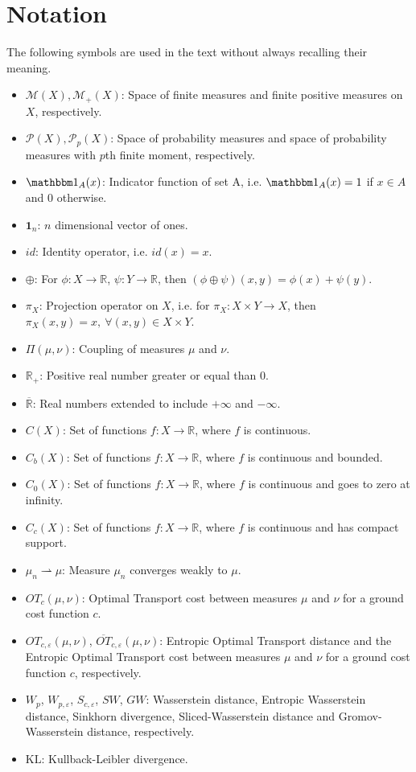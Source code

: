 
\newpage
\chapter*{Notation}

The following symbols are used in the text without always recalling their meaning.

\begin{itemize}
	\item $\mathcal M(X), \mathcal M_+(X)$: Space of finite measures and finite positive measures on $X$, respectively.
	\item $\mathcal P(X), \mathcal P_p(X)$: Space of probability measures and space of probability
	measures with $p$th finite moment, respectively.
	\item $\mathbbm 1_A(x)$: Indicator function of set A, i.e. $\mathbbm 1_A(x)=1$ if $x \in A$ and 0 otherwise.
	\item $\mathbf 1_n$: $n$ dimensional vector of ones.
	\item $id$: Identity operator, i.e. $id(x)=x$.
	\item $\oplus$: For $\phi: X \to \mathbb R$, $\psi: Y \to \mathbb R$, then $(\phi \oplus \psi)(x,y) = \phi(x) + \psi(y)$.
	\item $\pi_X$: Projection operator on $X$, i.e. for $\pi_X : X \times Y \to X$, then $\pi_X(x,y)= x, \ \forall (x,y) \in X \times Y$.
	\item $\Pi(\mu,\nu)$: Coupling of measures $\mu$ and $\nu$.
	\item $\mathbb R_+$: Positive real number greater or equal than 0.
	\item $\mathbb{\overline R}$: Real numbers extended to include $+\infty$ and $-\infty$.
	\item $C(X)$: Set of functions $f: X \to \mathbb R$, where $f$ is continuous.
	\item $C_b(X)$: Set of functions $f: X \to \mathbb R$, where $f$ is continuous and bounded.
	\item $C_0(X)$: Set of functions $f: X \to \mathbb R$, where $f$ is continuous and goes to zero at infinity.
	\item $C_c(X)$: Set of functions $f: X \to \mathbb R$, where $f$ is continuous and has compact support.
	\item $\mu_n \rightharpoonup \mu$: Measure $\mu_n$ converges weakly to $\mu$.
	\item $OT_c(\mu,\nu)$: Optimal Transport cost between measures $\mu$ and $\nu$ for a ground cost function $c$.
	\item $OT_{c,\varepsilon}(\mu,\nu)$, $\overline{OT}_{c,\varepsilon}(\mu,\nu)$:
	Entropic Optimal Transport distance and the Entropic Optimal Transport cost
	between measures $\mu$ and $\nu$ for a ground cost function $c$, respectively.
	\item $W_p$, $W_{p,\varepsilon}$, $S_{c,\varepsilon}$, $SW$, $GW$: Wasserstein distance, Entropic Wasserstein distance,
	Sinkhorn divergence,
	Sliced-Wasserstein distance and Gromov-Wasserstein distance, respectively.
	\item $\mathrm{KL}$: Kullback-Leibler divergence.
\end{itemize}

